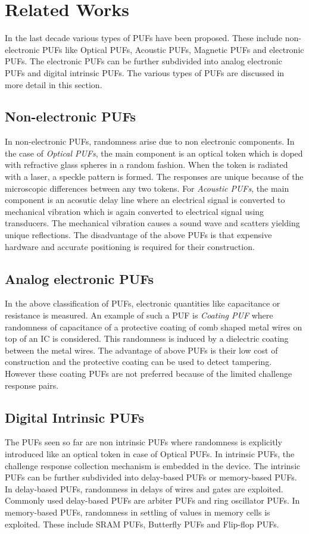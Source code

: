 \section{Related Works}
In the last decade various types of PUFs have been proposed. These include non-electronic PUFs like Optical PUFs, Acoustic PUFs, Magnetic PUFs and electronic PUFs. The electronic PUFs can be further subdivided into analog electronic PUFs and digital intrinsic PUFs. The various types of PUFs are discussed in more detail in this section.
\subsection{Non-electronic PUFs}
In non-electronic PUFs, randomness arise due to non electronic components. In the case of \textit{Optical PUFs}, the main component is an optical token which is doped with refractive glass spheres in a random fashion. When the token is radiated with a laser, a speckle pattern is formed. The responses are  unique because  of the microscopic differences between any two tokens. For \textit{Acoustic PUFs}, the main component is an acosutic delay line where an electrical signal is converted to mechanical vibration which is again converted to electrical signal using transducers. The mechanical vibration causes a sound wave and scatters yielding unique reflections. The disadvantage of the above PUFs is that expensive hardware and accurate positioning is required for their construction.
\subsection{Analog electronic PUFs}
In the above classification of PUFs, electronic quantities like capacitance or resistance is measured. An example of such a PUF is \textit{Coating PUF} where randomness of capacitance of a protective coating of comb shaped metal wires on top of an IC is considered. This randomness is induced by a dielectric coating between the metal wires. The advantage of above PUFs is their low cost of construction and the protective coating can be used to detect tampering. However these coating PUFs are not preferred because of the limited challenge response pairs.

\subsection{Digital Intrinsic PUFs}
The PUFs seen so far are non intrinsic PUFs where randomness is explicitly introduced like an optical token in case of Optical PUFs. In intrinsic PUFs, the challenge response collection mechanism is embedded in the device. The intrinsic PUFs can be further subdivided into delay-based PUFs or memory-based PUFs. In delay-based PUFs, randomness in delays of wires and gates are exploited. Commonly used delay-based PUFs are  arbiter PUFs and ring oscillator PUFs. In memory-based PUFs, randomness in settling of values in memory cells is exploited. These include SRAM PUFs, Butterfly PUFs and Flip-flop PUFs.

